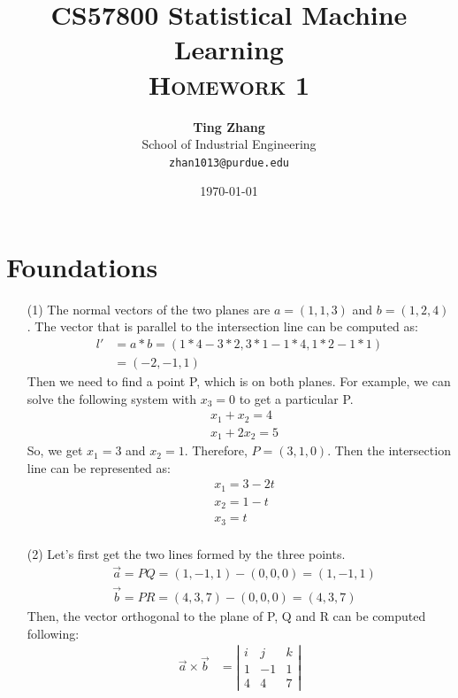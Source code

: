 \documentclass[11pt]{article}
\title{
\textbf{CS57800 Statistical Machine Learning} \\ \textsc{Homework 1} \\
\normalsize\vspace{0.1in}
}
\author{
	\textbf{Ting Zhang} \\
	School of Industrial Engineering\\
	\texttt{zhan1013@purdue.edu}
}
\date{\today}
\begin{document}
\maketitle

\section{Foundations}
\begin{itemize}
\item[(1)] The normal vectors of the two planes are \(a=(1,1,3)\) and \(b=(1,2,4)\). The vector that is parallel to the intersection line can be computed as:
\begin{equation*}
\begin{split}
l' & =a*b=(1*4-3*2,3*1-1*4,1*2-1*1) \\
 & =(-2,-1,1)
\end{split}
\end{equation*}
Then we need to find a point P, which is on both planes. For example, we can solve the following system with \(x_3=0\) to get a particular P.
\begin{align*}
& x_1+x_2=4 \\
& x_1+2x_2=5
\end{align*}
So, we get \(x_1=3\) and \(x_2=1\). Therefore, \(P=(3,1,0)\). Then the intersection line can be represented as:
\begin{align*}
&x_1=3-2t \\
&x_2=1-t \\
&x_3=t \\
\end{align*}
\item[(2)] Let's first get the two lines formed by the three points.
\begin{align*}
&\vec{a}=PQ=(1,-1,1)-(0,0,0)=(1,-1,1) \\
&\vec{b}=PR=(4,3,7)-(0,0,0)=(4,3,7)
\end{align*}
Then, the vector orthogonal to the plane of P, Q and R can be computed following:
\begin{equation*}
\begin{split}
\vec{a}\times\vec{b} & =\left| \begin{array}{ccc}
i & j & k \\
1 & -1 & 1 \\
4 & 4 & 7 \end{array} \right| \\

\end{split}
\end{equation*}
\end{itemize}
\end{document}
